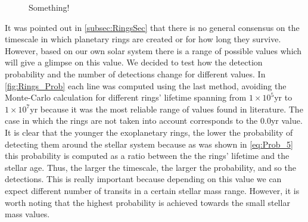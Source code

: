 \begin{figure}[!ht]%
    \centering
    \qquad
    \caption{\scriptsize{Something!}}%
    \label{fig:MonteAnalytic_2}%
\end{figure}

It was pointed out in \autoref{subsec:RingsSec} that there is no general consensus on the timescale in which planetary rings are created or for how long they survive. However, based on our own solar system there is a range of possible values which will give a glimpse on this value. We decided to test how the detection probability and the number of detections change for different values. In \autoref{fig:Rings_Prob} each line was computed using the last method, avoiding the Monte-Carlo calculation for different rings' lifetime spanning from $1\times 10^5$yr to $1\times 10^7$yr because it was the most reliable range of values found in literature. The case in which the rings are not taken into account corresponds to the $0.0$yr value. It is clear that the younger the exoplanetary rings, the lower the probability of detecting them around the stellar system because as was shown in \autoref{eq:Prob_5} this probability is computed as a ratio between the the rings' lifetime and the stellar age. Thus, the larger the timescale, the larger the probability, and so the detections. This is really important because depending on this value we can expect different number of transits in a certain stellar mass range. However, it is worth noting that the highest probability is achieved towards the small stellar mass values.\\

